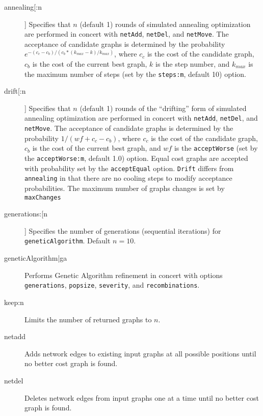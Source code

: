 		\begin{description}
		\item[annealing[:n]] Specifies that $n$ (default 1) rounds of simulated annealing optimization \citep{Metropolisetal1953, 
		Kirkpatricketal1983, Cerny1985} are performed in concert with \texttt{netAdd}, \texttt{netDel}, and \texttt{netMove}. 
		The acceptance of candidate graphs is determined by the probability $e ^ {- (c_c - c_b)/ (c_b * (k_{max} -k)/ k_{max})}$, 
		where $c_c$ is the cost of the candidate graph, $c_b$ is the cost of the current best graph, $k$ is the step number, 
		and $k_{max}$ is the maximum number of steps (set by the \texttt{steps:m}, default 10) option.
			
		\item[drift[:n]] Specifies that $n$ (default 1) rounds of the ``drifting'' form of simulated annealing \citep{goloboff1999} 
		optimization are performed in concert with \texttt{netAdd}, 	\texttt{netDel}, and \texttt{netMove}. The acceptance of 
		candidate graphs is determined by the probability $1/ (wf + c_c - c_b)$, where $c_c$ is the cost of the candidate 
		graph, $c_b$ is the cost of the current best graph, and $wf$ is the \texttt{acceptWorse} (set by the 
		\texttt{acceptWorse:m}, default 1.0) option. Equal cost graphs are accepted with probability set by the 
		\texttt{acceptEqual} option. \texttt{Drift} differs from \texttt{annealing} in that there are no cooling steps to modify 
		acceptance probabilities. The maximum number of graphs changes is set by \texttt{maxChanges}
			
		\item[generations:[n]] Specifies the number of generations (sequential iterations) for \texttt{geneticAlgorithm}. 
		Default $n=10$.
			
		\item[geneticAlgorithm|ga] Performs Genetic Algorithm \citep{Holland1975} refinement in concert with options 
		\texttt{generations}, \texttt{popsize}, \texttt{severity}, and \texttt{recombinations}. 
			
		\item[keep:n] Limits the number of returned graphs to $n$. 
		
		\item[netadd] Adds network edges to existing input graphs at all possible positions until no better cost graph is found.
			
		\item[netdel] Deletes network edges from input graphs one at a time until no better cost 
		graph is found.
			

\end{description}
